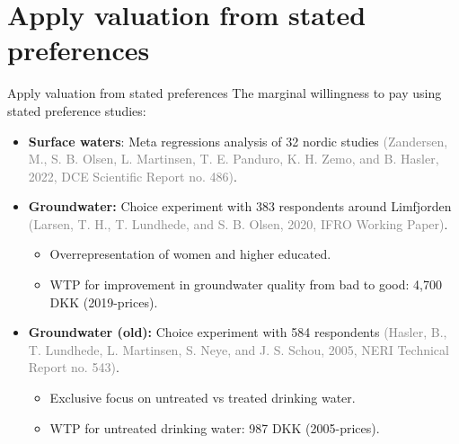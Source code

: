 \section{Apply valuation from stated preferences}

\begin{frame}{Apply valuation from stated preferences}\label<4>{frame:Valuation}
  The marginal willingness to pay using stated preference studies:
  \begin{itemize}
    \item \textbf{Surface waters}: Meta regressions analysis of 32 nordic studies \textcolor{grey}{(Zandersen, M., S. B. Olsen, L. Martinsen, T. E. Panduro, K. H. Zemo, and B. Hasler, 2022, DCE Scientific Report no. 486)}.
    \pause
    \item \textbf{Groundwater:} Choice experiment with 383 respondents around Limfjorden \textcolor{grey}{(Larsen, T. H., T. Lundhede, and S. B. Olsen, 2020, IFRO Working Paper)}. \hspace{4.5cm}\hyperlink{app:SurveyExample}{}
    \pause
    \begin{itemize}\normalsize
      \item Overrepresentation of women and higher educated.
      \item WTP for improvement in groundwater quality from bad to good: 4,700 DKK (2019-prices).
    \end{itemize}
    \pause
    \item \textbf{Groundwater (old):} Choice experiment with 584 respondents \textcolor{grey}{(Hasler, B., T. Lundhede, L. Martinsen, S. Neye, and J. S. Schou, 2005, NERI Technical Report no. 543)}.
    \begin{itemize}\normalsize
      \item Exclusive focus on untreated vs treated drinking water.
      \item WTP for untreated drinking water: 987 DKK (2005-prices).
    \end{itemize}      
  \end{itemize}
\end{frame}